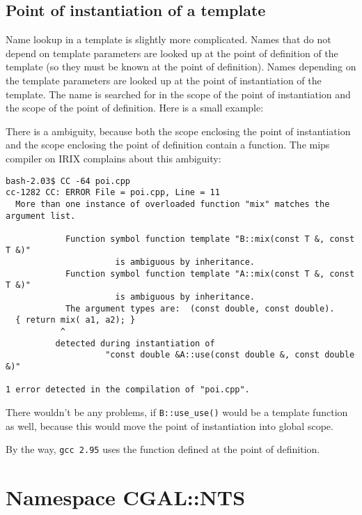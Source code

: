 \subsection{Point of instantiation of a template}
Name lookup in a template is slightly more complicated.
Names that do not depend on template parameters are looked up at the point
of definition of the template%
(so they must be known at the point of definition). 
Names depending on the template parameters are looked up at
the point of instantiation%
 of the template. 
The name is searched for in the
scope of the point of instantiation and the scope of the
point of definition. Here is a small example:


There is a ambiguity, because both the scope enclosing the point of 
instantiation and the scope enclosing the point of definition contain
a  function. The mips compiler on {\sc IRIX} 
complains about this ambiguity: 

{\small
\begin{verbatim}
bash-2.03$ CC -64 poi.cpp 
cc-1282 CC: ERROR File = poi.cpp, Line = 11
  More than one instance of overloaded function "mix" matches the argument list.

            Function symbol function template "B::mix(const T &, const T &)"
                      is ambiguous by inheritance.
            Function symbol function template "A::mix(const T &, const T &)"
                      is ambiguous by inheritance.
            The argument types are:  (const double, const double).
  { return mix( a1, a2); }
           ^
          detected during instantiation of
                    "const double &A::use(const double &, const double &)" 

1 error detected in the compilation of "poi.cpp".
\end{verbatim}
}
There wouldn't be any problems, if \verb+B::use_use()+ would be a template
function as well, because this would move the point of instantiation
into global scope.

By the way, \verb+gcc 2.95+ uses the function defined at the 
point of definition.

\section{Namespace CGAL::NTS}


